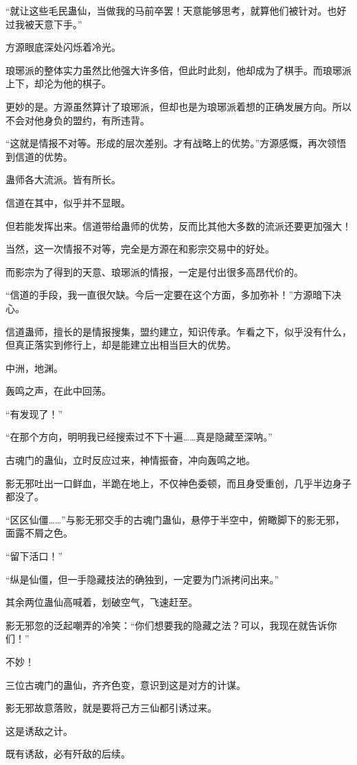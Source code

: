 \begin{this_body}
“就让这些毛民蛊仙，当做我的马前卒罢！天意能够思考，就算他们被针对。也好过我被天意下手。”

方源眼底深处闪烁着冷光。

琅琊派的整体实力虽然比他强大许多倍，但此时此刻，他却成为了棋手。而琅琊派上下，却沦为他的棋子。

更妙的是。方源虽然算计了琅琊派，但却也是为琅琊派着想的正确发展方向。所以不会对他身负的盟约，有所违背。

“这就是情报不对等。形成的层次差别。才有战略上的优势。”方源感慨，再次领悟到信道的优势。

蛊师各大流派。皆有所长。

信道在其中，似乎并不显眼。

但若能发挥出来。信道带给蛊师的优势，反而比其他大多数的流派还要更加强大！

当然，这一次情报不对等，完全是方源在和影宗交易中的好处。

而影宗为了得到的天意、琅琊派的情报，一定是付出很多高昂代价的。

“信道的手段，我一直很欠缺。今后一定要在这个方面，多加弥补！”方源暗下决心。

信道蛊师，擅长的是情报搜集，盟约建立，知识传承。乍看之下，似乎没有什么，但真正落实到修行上，却是能建立出相当巨大的优势。

中洲，地渊。

轰鸣之声，在此中回荡。

“有发现了！”

“在那个方向，明明我已经搜索过不下十遍……真是隐藏至深呐。”

古魂门的蛊仙，立时反应过来，神情振奋，冲向轰鸣之地。

影无邪吐出一口鲜血，半跪在地上，不仅神色委顿，而且身受重创，几乎半边身子都没了。

“区区仙僵……”与影无邪交手的古魂门蛊仙，悬停于半空中，俯瞰脚下的影无邪，面露不屑之色。

“留下活口！”

“纵是仙僵，但一手隐藏技法的确独到，一定要为门派拷问出来。”

其余两位蛊仙高喊着，划破空气，飞速赶至。

影无邪忽的泛起嘲弄的冷笑：“你们想要我的隐藏之法？可以，我现在就告诉你们！”

不妙！

三位古魂门的蛊仙，齐齐色变，意识到这是对方的计谋。

影无邪故意落败，就是要将己方三仙都引诱过来。

这是诱敌之计。

既有诱敌，必有歼敌的后续。


\end{this_body}

